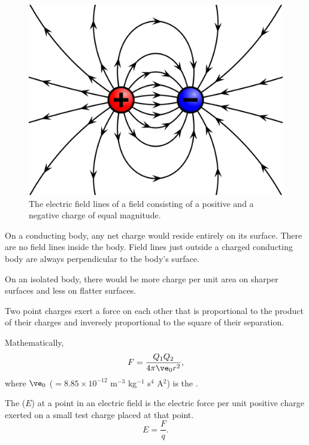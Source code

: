 \begin{figure}[H]
    \centering
    \includegraphics[scale=0.1]{media/Electric Field Line.png}
    \caption{The electric field lines of a field consisting of a positive and a negative charge of equal magnitude.\protect\footnotemark}
\end{figure}

On a conducting body, any net charge would reside entirely on its surface. There are no field lines inside the body. Field lines just outside a charged conducting body are always perpendicular to the body's surface.

On an isolated body, there would be more charge per unit area on sharper surfaces and less on flatter surfaces.

\begin{law}
    Two point charges exert a force on each other that is proportional to the product of their charges and inversely proportional to the square of their separation.
\end{law}

Mathematically, \[F = \frac{Q_1 Q_2}{4\pi \ve_0 r^2},\] where $\ve_0$ ($= 8.85 \times 10^{-12}$ m$^{-3}$ kg$^{-1}$ s$^4$ A$^2$) is the .

\begin{definition}
    The  ($E$) at a point in an electric field is the electric force per unit positive charge exerted on a small test charge placed at that point. \[E = \frac{F}{q}.\]
\end{definition}

